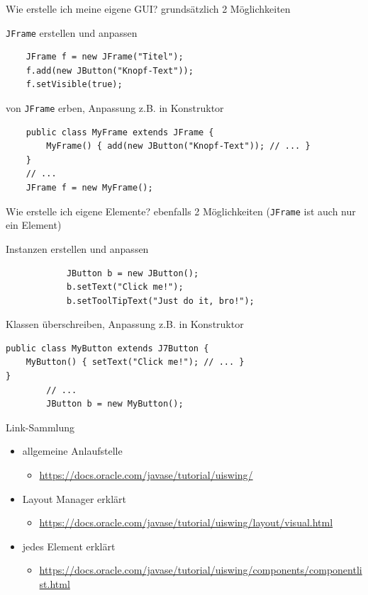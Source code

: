 \documentclass[18pt]{beamer}
\begin{document}
\begin{frame}[fragile]{Wie erstelle ich meine eigene GUI?}
grundsätzlich 2 Möglichkeiten
\begin{block}{\texttt{JFrame} erstellen und anpassen}
	\begin{verbatim}
	JFrame f = new JFrame("Titel");
	f.add(new JButton("Knopf-Text"));
	f.setVisible(true);
	\end{verbatim}
\end{block}
\pause
\begin{block}{von \texttt{JFrame} erben, Anpassung z.B. in Konstruktor}
	\begin{verbatim}
	public class MyFrame extends JFrame { 
	    MyFrame() { add(new JButton("Knopf-Text")); // ... } 
	}
	// ...
	JFrame f = new MyFrame();
	\end{verbatim}
\end{block}
\end{frame}

\begin{frame}[fragile]{Wie erstelle ich eigene Elemente?}
	ebenfalls 2 Möglichkeiten (\texttt{JFrame} ist auch nur ein Element)
	\begin{block}{Instanzen erstellen und anpassen}
		\begin{verbatim}
			JButton b = new JButton();
			b.setText("Click me!");
			b.setToolTipText("Just do it, bro!");
		\end{verbatim}
	\end{block}
	\pause
		\begin{block}{Klassen überschreiben, Anpassung z.B. in Konstruktor}
		\begin{verbatim}
public class MyButton extends J7Button { 
    MyButton() { setText("Click me!"); // ... } 
}
		// ...
		JButton b = new MyButton();
		\end{verbatim}
	\end{block}
\end{frame}


\begin{frame}{Link-Sammlung}
	\begin{itemize}
		\item allgemeine Anlaufstelle
		\begin{itemize}
			\item \url{https://docs.oracle.com/javase/tutorial/uiswing/}
		\end{itemize}
		\item Layout Manager erklärt
		\begin{itemize}
			\item \url{https://docs.oracle.com/javase/tutorial/uiswing/layout/visual.html}
		\end{itemize}
		\item jedes Element erklärt
		\begin{itemize}
			\item \url{https://docs.oracle.com/javase/tutorial/uiswing/components/componentlist.html}
		\end{itemize}
	\end{itemize}	
\end{frame}
\end{document}
